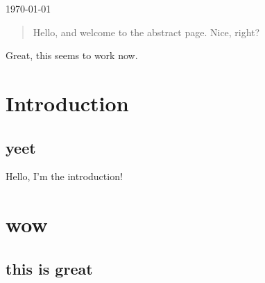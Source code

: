 \begin{titlepage}


  \vfill\vfill\vfill %

  {\large\today} %




  \vfill %

\end{titlepage}


\begin{abstract}
  Hello, and welcome to the abstract page. Nice, right?
\end{abstract}
\newpage

\tableofcontents
{}
\newpage
{}

Great, this seems to work now.

\section{Introduction}
\subsection{yeet}
Hello, I'm the introduction!

\section{wow}
\subsection{this is great}
